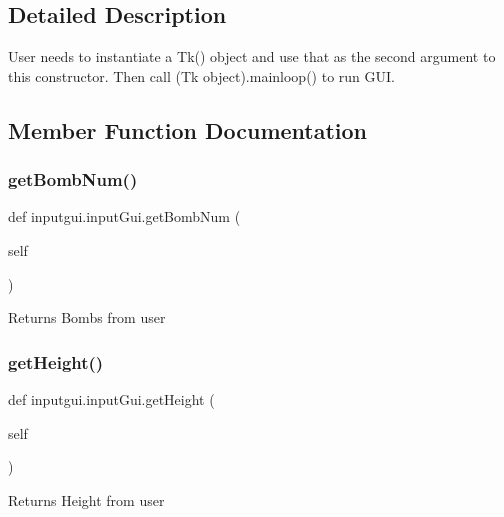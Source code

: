 \subsection{Detailed Description}
\begin{DoxyVerb}User needs to instantiate a Tk() object and use that as the second argument to this constructor. Then call
    (Tk object).mainloop() to run GUI.
\end{DoxyVerb}
 

\subsection{Member Function Documentation}
\mbox{\label{classinputgui_1_1input_gui_ad092a378c7af02c7bef4055297ad10d0}} 
\subsubsection{\texorpdfstring{get\+Bomb\+Num()}{getBombNum()}}
{\footnotesize\ttfamily def inputgui.\+input\+Gui.\+get\+Bomb\+Num (\begin{DoxyParamCaption}\item[{}]{self }\end{DoxyParamCaption})}

\begin{DoxyVerb}Returns Bombs from user
\end{DoxyVerb}
 \mbox{\label{classinputgui_1_1input_gui_a0f58dcdd5da2004e96ce2e846aa8d70b}} 
\subsubsection{\texorpdfstring{get\+Height()}{getHeight()}}
{\footnotesize\ttfamily def inputgui.\+input\+Gui.\+get\+Height (\begin{DoxyParamCaption}\item[{}]{self }\end{DoxyParamCaption})}

\begin{DoxyVerb}Returns Height from user
\end{DoxyVerb}
 \mbox{\label{classinputgui_1_1input_gui_acb2f03dc243b615d56b85025e72fe83d}} 
